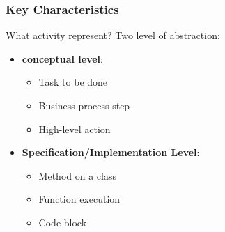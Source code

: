 \subsubsection{Key Characteristics}
What activity represent? Two level of abstraction:
\begin{itemize}
    \item \textbf{conceptual level}:
    \begin{itemize}
        \item Task to be done
        \item Business process step
        \item High-level action
    \end{itemize}
    \item \textbf{Specification/Implementation Level}:
    \begin{itemize}
        \item Method on a class
        \item Function execution
        \item Code block
    \end{itemize}
\end{itemize}


